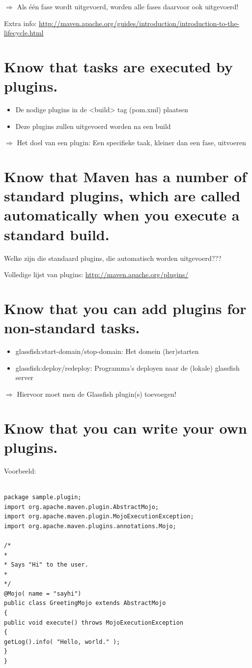 $\Rightarrow$ Als één fase wordt uitgevoerd, worden alle fases daarvoor ook uitgevoerd!

Extra info: \url{http://maven.apache.org/guides/introduction/introduction-to-the-lifecycle.html}

\section{Know that tasks are executed by plugins.}
\begin{itemize}
	\item De nodige plugins in de <build> tag (pom.xml) plaatsen
	\item Deze plugins zullen uitgevoerd worden na een build
\end{itemize}

$\Rightarrow$ Het doel van een plugin: Een specifieke taak, kleiner dan een fase, uitvoeren

\section{Know that Maven has a number of standard plugins, which are called automatically when you execute a standard build.}

Welke zijn die standaard plugins, die automatisch worden uitgevoerd???

Volledige lijst van plugins: \url{http://maven.apache.org/plugins/}

\section{Know that you can add plugins for non-standard tasks.}

\begin{itemize}
	\item glassfish:start-domain/stop-domain: Het domein (her)starten
	\item glassfish:deploy/redeploy: Programma’s deployen naar de (lokale) glassfish server
\end{itemize}

$\Rightarrow$ Hiervoor moet men de Glassfish plugin(s) toevoegen!

\section{Know that you can write your own plugins.}


Voorbeeld:

\begin{verbatim}

package sample.plugin;
import org.apache.maven.plugin.AbstractMojo;
import org.apache.maven.plugin.MojoExecutionException;
import org.apache.maven.plugins.annotations.Mojo;

/*
*
* Says "Hi" to the user.
*
*/
@Mojo( name = "sayhi")
public class GreetingMojo extends AbstractMojo
{
public void execute() throws MojoExecutionException
{
getLog().info( "Hello, world." );
}
}
\end{verbatim}

